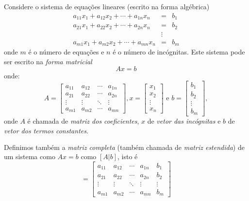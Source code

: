 Considere o sistema de equações lineares (escrito na forma algébrica)
\begin{eqnarray*}
a_{11}x_1 + a_{12}x_2 + \cdots +a_{1n}x_n &=& b_1\\
a_{21}x_1 + a_{22}x_2 + \cdots +a_{2n}x_n &=& b_2\\
                                      &\vdots& \\
a_{m1}x_1 + a_{m2}x_2 + \cdots +a_{mn}x_n &=& b_m
\end{eqnarray*}
onde $m$ é o número de equações e $n$ é o número de incógnitas.  Este sistema pode ser escrito na \emph{forma matricial}
\begin{equation*}
  Ax = b
\end{equation*}
onde:
\begin{equation*}
  A=\begin{bmatrix}
a_{11} & a_{12} & \cdots & a_{1n}\\
a_{21} & a_{22} & \cdots & a_{2n}\\
\vdots & \vdots & \ddots & \vdots\\
a_{m1} & a_{m2} & \cdots & a_{mn}
\end{bmatrix},
x=\begin{bmatrix}
x_{1} \\
x_{2} \\
\vdots \\
x_{n}
\end{bmatrix}
 \text{ e } b=\begin{bmatrix}
b_{1} \\
b_{2} \\
\vdots \\
b_{m}
\end{bmatrix},
\end{equation*}
onde $A$ é chamada de \emph{matriz dos coeficientes}, $x$ de \emph{vetor das incógnitas} e $b$ de \emph{vetor dos termos constantes}.


Definimos também a \emph{matriz completa} (também chamada de \emph{matriz estendida}) de um sistema como $Ax=b$ como $[A|b]$, isto é
\begin{equation*}
 [A|b]=\left[\begin{array}{cccc|c}
a_{11} & a_{12} & \cdots & a_{1n}&b_1\\
a_{21} & a_{22} & \cdots & a_{2n}&b_2\\
\vdots & \vdots & \ddots & \vdots&\vdots\\
a_{m1} & a_{m2} & \cdots & a_{mn}&b_m
\end{array}\right]
\end{equation*}


